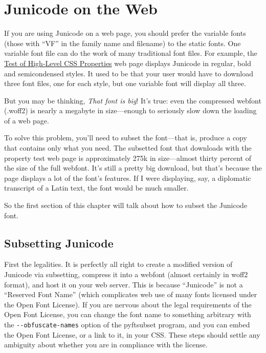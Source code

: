 \documentclass[12pt,letterpaper,openany]{book}
\begin{document}
\chapter*{Junicode on the Web}

If you are using Junicode on a web page, you should prefer the variable fonts
(those with “VF” in the family name and filename) to the static fonts. One
variable font file can do the work of many traditional font files. For example,
the \href{https://psb1558.github.io/Junicode-font/Junicode-2-feature-test.html}%
{Test of High-Level CSS Properties} web page displays Junicode in regular,
bold and semicondensed styles. It used
to be that your user would have to download three font files, one for each
style, but one variable font will display all three.

But you may be thinking, \textit{That font is big}! It's true: even the
compressed webfont (.woff2) is nearly a megabyte in size—enough to seriously
slow down the loading of a web page.

To solve this problem, you'll need to subset the font—that is, produce a copy
that contains only what you need. The subsetted font that downloads
with the property test web page
is approximately 275k in size—almost thirty percent of the
size of the full webfont. It's still a pretty big download, but that's because the page
displays a lot of the font's features. If I were displaying, say, a diplomatic
transcript of a Latin text, the font would be much smaller.

So the first section of this chapter will talk about how to subset the Junicode
font.

\section{Subsetting Junicode}

First the legalities. It is perfectly all right to create a modified version
of Junicode via subsetting, compress it into a webfont (almost certainly in
woff2 format), and host it on your web server. This is because “Junicode” is
not a “Reserved Font Name” (which complicates web use of
many fonts licensed under the Open Font License). If you are nervous about the
legal requirements of the Open Font License, you can change the font name to
something arbitrary with the \texttt{-‌-obfuscate-names} option
of the pyftsubset program, and you can embed the Open Font License, or a
link to it, in your CSS. These steps should settle any ambiguity about whether
you are in compliance with the license.
\end{document}
